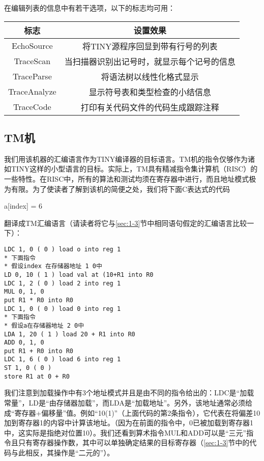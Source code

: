 \documentclass[lang=cn,10pt]{elegantbook}
\begin{document}
在编辑列表的信息中有若干选项，以下的标志均可用：

\begin{center}
\begin{tabular}{cc}
  \hline
  标志 & 设置效果 \\
  \hline
  EchoSource   & 将TINY源程序回显到带有行号的列表 \\
  TraceScan    & 当扫描器识别出记号时，就显示每个记号的信息 \\
  TraceParse   & 将语法树以线性化格式显示 \\
  TraceAnalyze & 显示符号表和类型检查的小结信息 \\
  TraceCode    & 打印有关代码文件的代码生成跟踪注释 \\
  \hline
\end{tabular}
\end{center}

\subsection{TM机}
\label{subsec:1-7-3}

我们用该机器的汇编语言作为TINY编译器的目标语言。TM机的指令仅够作为诸如TINY这样的小型语言的目标。实际上，TM具有精减指令集计算机（RISC）的一些特性。在RISC中，所有的算法和测试均须在寄存器中进行，而且地址模式极为有限。为了使读者了解到该机的简便之处，我们将下面C表达式的代码

a[index] = 6

翻译成TM汇编语言（请读者将它与\ref{sec:1-3}节中相同语句假定的汇编语言比较一下）：

\begin{lstlisting}
LDC 1, 0 ( 0 ) load o into reg 1
* 下面指令
* 假设index 在存储器地址 1 0中
LD 0, 10 ( 1 ) load val at (10+R1 into R0
LDC 1, 2 ( 0 ) load 2 into reg 1
MUL 0, 1, 0
put R1 * R0 into R0
LDC 1, 0 ( 0 ) load 0 into reg 1
* 下面指令
* 假设a在存储器地址 2 0中
LDA 1, 20 ( 1 ) load 20 + R1 into R0
ADD 0, 1, 0
put R1 + R0 into R0
LDC 1, 6 ( 0 ) load 6 into reg 1
ST 1, 0 ( 0 )
store R1 at 0 + R0
\end{lstlisting}

我们注意到加载操作中有3个地址模式并且是由不同的指令给出的：LDC是“加载常量”，LD是“由存储器加载”，而LDA是“加载地址”。另外，该地址通常必须给成“寄存器+偏移量”值。例如“10(1)”（上面代码的第2条指令），它代表在将偏差10加到寄存器1的内容中计算该地址。（因为在前面的指令中，0已被加载到寄存器1中，这实际是指绝对位置10）。我们还看到算术指令MUL和ADD可以是“三元”指令且只有寄存器操作数，其中可以单独确定结果的目标寄存器（\ref{sec:1-3}节中的代码与此相反，其操作是“二元的”）。
\end{document}
